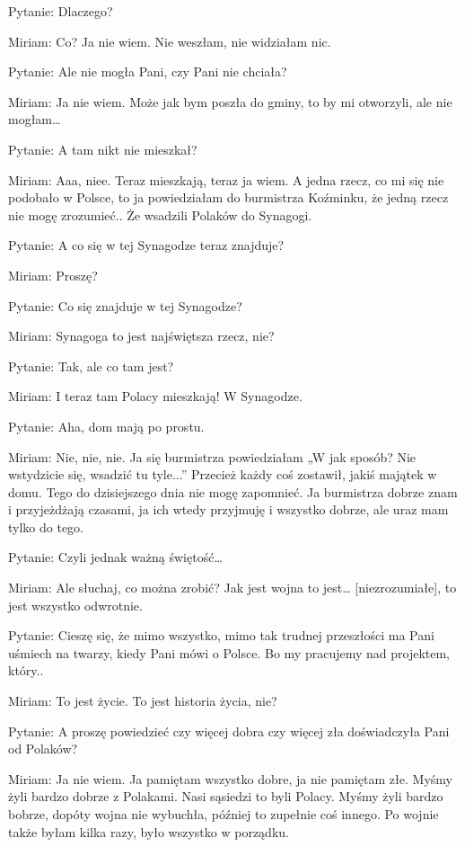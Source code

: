 Pytanie: Dlaczego? 

Miriam: Co? Ja nie wiem. Nie weszłam, nie widziałam nic. 

Pytanie: Ale nie mogła Pani, czy Pani nie chciała? 

Miriam: Ja nie wiem. Może jak bym poszła do gminy, to by mi otworzyli, ale nie mogłam… 

Pytanie: A tam nikt nie mieszkał? 

Miriam: Aaa, niee. Teraz mieszkają, teraz ja wiem. A jedna rzecz, co mi się nie podobało w Polsce, to ja powiedziałam do burmistrza Koźminku, że jedną rzecz nie mogę zrozumieć.. Że wsadzili Polaków do Synagogi. 

Pytanie: A co się w tej Synagodze teraz znajduje? 

Miriam: Proszę? 

Pytanie: Co się znajduje w tej Synagodze? 

Miriam: Synagoga to jest najświętsza rzecz, nie? 

Pytanie: Tak, ale co tam jest? 

Miriam: I teraz tam Polacy mieszkają! W Synagodze. 

Pytanie: Aha, dom mają po prostu. 

Miriam: Nie, nie, nie. Ja się burmistrza powiedziałam „W jak sposób? Nie wstydzicie się, wsadzić tu tyle...” Przecież każdy coś zostawił, jakiś majątek w domu. Tego do dzisiejszego dnia nie mogę zapomnieć. Ja burmistrza dobrze znam i przyjeżdżają czasami, ja ich wtedy przyjmuję i wszystko dobrze, ale uraz mam tylko do tego. 

Pytanie: Czyli jednak ważną świętość… 

Miriam: Ale słuchaj, co można zrobić? Jak jest wojna to jest… [niezrozumiałe], to jest wszystko odwrotnie. 

Pytanie: Cieszę się, że mimo wszystko, mimo tak trudnej przeszłości ma Pani uśmiech na twarzy, kiedy Pani mówi o Polsce. Bo my pracujemy nad projektem, który.. 

Miriam: To jest życie. To jest historia życia, nie? 

Pytanie: A proszę powiedzieć czy więcej dobra czy więcej zła doświadczyła Pani od Polaków? 

Miriam: Ja nie wiem. Ja pamiętam wszystko dobre, ja nie pamiętam złe. Myśmy żyli bardzo dobrze z Polakami. Nasi sąsiedzi to byli Polacy. Myśmy żyli bardzo bobrze, dopóty wojna nie wybuchła, później to zupełnie coś innego. Po wojnie także byłam kilka razy, było wszystko w porządku. 


